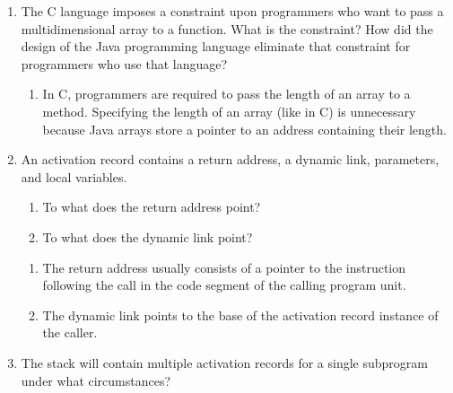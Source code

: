 \begin{enumerate}
\begin{answer}
    \end{answer}

  \item The C language imposes a constraint upon programmers
    who want to pass a multidimensional array to a function.
    What is the constraint? How did the design of the Java
    programming language eliminate that constraint for 
    programmers who use that language?

  
    \begin{answer}

    \begin{enumerate}
    \item In C, programmers are required to pass the length of an
      array to a method.  Specifying the length of an array (like in
      C) is unnecessary because Java arrays store a pointer to an
      address containing their length.
 
    \end{enumerate}

    \end{answer}

  \item An activation record contains a return
    address, a dynamic link, parameters, and
    local variables.
  \begin{enumerate}
    \item To what does the return address point?
    \item To what does the dynamic link point?
    \end{enumerate}

  
    \begin{answer}

    \begin{enumerate}
    \item The return address usually consists of a pointer to the
      instruction following the call in the code segment of the
      calling program unit.
    \item The dynamic link points to the base of the activation record
      instance of the caller.
    \end{enumerate}

    \end{answer}

  \item The stack will contain multiple activation
    records for a single subprogram under what
    circumstances?

    \begin{answer}


\end{answer}
\end{enumerate}
